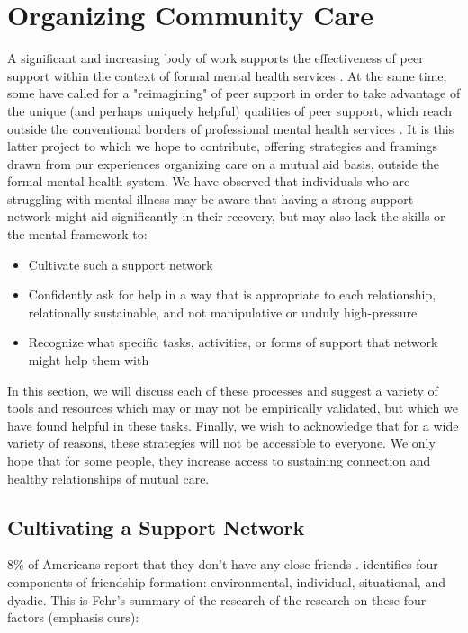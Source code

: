 \documentclass[12pt,letterpaper]{book}
\begin{document}
\section{Organizing Community Care}
\label{sec:organizingcare}
A significant and increasing body of work supports the effectiveness of peer support within the context of formal mental health services \cite{shalaby2020peer}. At the same time, some have called for a "reimagining" of peer support in order to take advantage of the unique (and perhaps uniquely helpful) qualities of peer support, which reach outside the conventional borders of professional mental health services \cite{gillard2019peer}. It is this latter project to which we hope to contribute, offering strategies and framings drawn from our experiences organizing care on a mutual aid basis, outside the formal mental health system. We have observed that individuals who are struggling with mental illness may be aware that having a strong support network might aid significantly in their recovery, but may also lack the skills or the mental framework to:
\begin{itemize}
	\item Cultivate such a support network
	\item Confidently ask for help in a way that is appropriate to each relationship, relationally sustainable, and not manipulative or unduly high-pressure
	\item Recognize what specific tasks, activities, or forms of support that network might help them with
\end{itemize}

In this section, we will discuss each of these processes and suggest a variety of tools and resources which may or may not be empirically validated, but which we have found helpful in these tasks. Finally, we wish to acknowledge that for a wide variety of reasons, these strategies will not be accessible to everyone. We only hope that for some people, they increase access to sustaining connection and healthy relationships of mutual care.

\subsection*{Cultivating a Support Network}

8\% of Americans report that they don't have any close friends \cite{pewFriends}. \textcite{fehr2008friendship} identifies four components of friendship formation: environmental, individual, situational, and dyadic. This is Fehr's summary of the research of the research on these four factors (emphasis ours):
\end{document}
